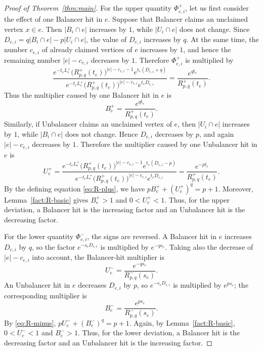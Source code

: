 \documentclass[twoside,12pt]{article}
\numberwithin{equation}{section}
\begin{document}
\begin{proof}[Proof of Theorem~\ref{thm:main}]
For the upper quantity $\Phi_{e,i}^+$, let us first consider the effect of one Balancer hit in $e$. Suppose that Balancer claims an unclaimed vertex $x\in e$. Then $|B_i\cap e|$ increases by $1$, while $|U_i\cap e|$ does not change. Since
$D_{e,i}=q|B_i\cap e|-p|U_i\cap e|$,
the value of $D_{e,i}$ increases by $q$. At the same time, the number $c_{e,i}$ of already claimed vertices of $e$ increases by $1$, and hence the remaining number $|e|-c_{e,i}$ decreases by $1$. Therefore $\Phi_{e,i}^+$ is multiplied by
\[
        \frac{
        e^{-t_eL_e^+}
        \bigl(R^+_{p,q}(t_e)\bigr)^{|e|-c_{e,i}-1}
        e^{t_e(D_{e,i}+q)}
        }{
        e^{-t_eL_e^+}
        \bigl(R^+_{p,q}(t_e)\bigr)^{|e|-c_{e,i}}
        e^{t_eD_{e,i}}
        }
        =
        \frac{e^{qt_e}}{R^+_{p,q}(t_e)}.
\]
Thus the multiplier caused by one Balancer hit in $e$ is
\[
        B_e^+
        =
        \frac{e^{qt_e}}{R^+_{p,q}(t_e)}.
\]
Similarly, if Unbalancer claims an unclaimed vertex of $e$, then $|U_i\cap e|$ increases by $1$, while $|B_i\cap e|$ does not change.  Hence $D_{e,i}$ decreases by $p$, and again $|e|-c_{e,i}$ decreases by $1$. Therefore the multiplier caused by one Unbalancer hit in $e$ is
\[
        U_e^+
        =
        \frac{
        e^{-t_eL_e^+}
        \bigl(R^+_{p,q}(t_e)\bigr)^{|e|-c_{e,i}-1}
        e^{t_e(D_{e,i}-p)}
        }{
        e^{-t_eL_e^+}
        \bigl(R^+_{p,q}(t_e)\bigr)^{|e|-c_{e,i}}
        e^{t_eD_{e,i}}
        }
        =
        \frac{e^{-pt_e}}{R^+_{p,q}(t_e)}.
\]
By the defining equation \eqref{eq:R-plus}, we have
$pB_e^+ +(U_e^+)^q=p+1$.
Moreover, Lemma~\ref{fact:R-basic} gives
$B_e^+>1$ and
        $0<U_e^+<1$.
Thus, for the upper deviation, a Balancer hit is the increasing factor and an Unbalancer hit is the decreasing factor.

For the lower quantity $\Phi_{e,i}^-$, the signs are reversed. A Balancer hit in $e$ increases $D_{e,i}$ by $q$, so the factor $e^{-s_eD_{e,i}}$ is multiplied by $e^{-qs_e}$.  Taking also the decrease of $|e|-c_{e,i}$ into account, the Balancer-hit multiplier is
\[
        U_e^-
        =
        \frac{e^{-qs_e}}{R^-_{p,q}(s_e)}.
\]
An Unbalancer hit in $e$ decreases $D_{e,i}$ by $p$, so $e^{-s_eD_{e,i}}$ is multiplied by $e^{ps_e}$; the corresponding multiplier is
\[
        B_e^-
        =
        \frac{e^{ps_e}}{R^-_{p,q}(s_e)}.
\]
By \eqref{eq:R-minus},
$pU_e^- +(B_e^-)^q=p+1$.
Again, by Lemma~\ref{fact:R-basic},
$0<U_e^-<1$ and
        $B_e^->1$.
Thus, for the lower deviation, a Balancer hit is the decreasing factor and an Unbalancer hit is the increasing factor.


\end{proof}
\end{document}
